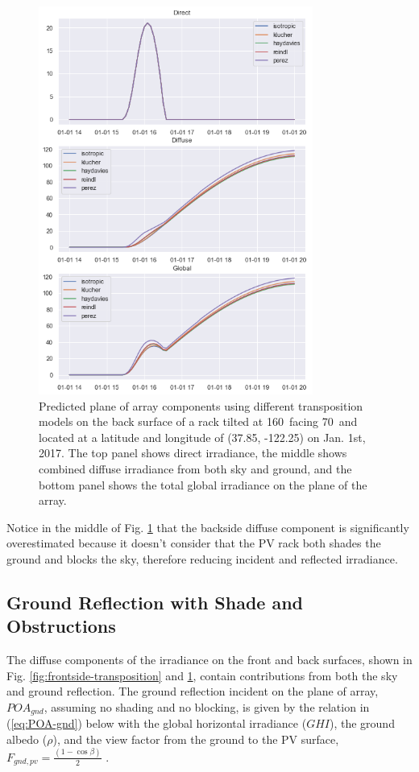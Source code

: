 \documentclass[conference]{IEEEtran}
\begin{document}
\begin{figure}
\centering
\includegraphics[width=9cm]{backside_transposition.png}
\caption{Predicted plane of array components using different transposition models on the back surface of a rack tilted at 160\degree\ facing 70\degree\ and located at a latitude and longitude of (37.85\degree, -122.25\degree) on Jan. 1st, 2017.  The top panel shows direct irradiance, the middle shows combined diffuse irradiance from both sky and ground, and the bottom panel shows the total global irradiance on the plane of the array.}
\label{fig:backside-transposition}
\end{figure}

Notice in the middle of Fig. \ref{fig:backside-transposition} that the backside diffuse component is significantly overestimated because it doesn't consider that the PV rack both shades the ground and blocks the sky, therefore reducing incident and reflected irradiance.

\subsection{ Ground Reflection with Shade and Obstructions}
The diffuse components of the irradiance on the front and back surfaces, shown in Fig. \ref{fig:frontside-transposition} and \ref{fig:backside-transposition}, contain contributions from both the sky and ground reflection.  The ground reflection incident on the plane of array, $POA_{gnd}$, assuming no shading and no blocking, is given by the relation in (\ref{eq:POA-gnd}) below with the global horizontal irradiance ($GHI$), the ground albedo ($\rho$), and the view factor from the ground to the PV surface, $F_{gnd,pv} = \frac{\left(1-\cos\beta\right)}{2}$ \cite{Marion2017}.
\end{document}
